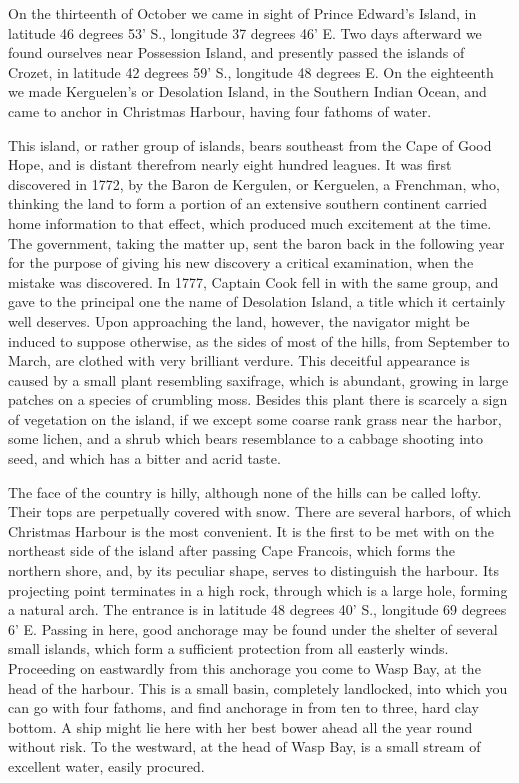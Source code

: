 On the thirteenth of October we came in sight of Prince Edward's Island, in
latitude 46 degrees 53' S., longitude 37 degrees 46' E. Two days afterward we
found ourselves near Possession Island, and presently passed the islands of
Crozet, in latitude 42 degrees 59' S., longitude 48 degrees E. On the eighteenth
we made Kerguelen's or Desolation Island, in the Southern Indian Ocean, and came
to anchor in Christmas Harbour, having four fathoms of water. 

This island, or rather group of islands, bears southeast from the Cape of
Good Hope, and is distant therefrom nearly eight hundred leagues. It was first
discovered in 1772, by the Baron de Kergulen, or Kerguelen, a Frenchman, who,
thinking the land to form a portion of an extensive southern continent carried
home information to that effect, which produced much excitement at the time. The
government, taking the matter up, sent the baron back in the following year for
the purpose of giving his new discovery a critical examination, when the mistake
was discovered. In 1777, Captain Cook fell in with the same group, and gave to
the principal one the name of Desolation Island, a title which it certainly well
deserves. Upon approaching the land, however, the navigator might be induced to
suppose otherwise, as the sides of most of the hills, from September to March,
are clothed with very brilliant verdure. This deceitful appearance is caused by
a small plant resembling saxifrage, which is abundant, growing in large patches
on a species of crumbling moss. Besides this plant there is scarcely a sign of
vegetation on the island, if we except some coarse rank grass near the harbor,
some lichen, and a shrub which bears resemblance to a cabbage shooting into
seed, and which has a bitter and acrid taste. 

The face of the country is hilly, although none of the hills can be called
lofty. Their tops are perpetually covered with snow. There are several harbors,
of which Christmas Harbour is the most convenient. It is the first to be met
with on the northeast side of the island after passing Cape Francois, which
forms the northern shore, and, by its peculiar shape, serves to distinguish the
harbour. Its projecting point terminates in a high rock, through which is a
large hole, forming a natural arch. The entrance is in latitude 48 degrees 40'
S., longitude 69 degrees 6' E. Passing in here, good anchorage may be found
under the shelter of several small islands, which form a sufficient protection
from all easterly winds. Proceeding on eastwardly from this anchorage you come
to Wasp Bay, at the head of the harbour. This is a small basin, completely
landlocked, into which you can go with four fathoms, and find anchorage in from
ten to three, hard clay bottom. A ship might lie here with her best bower ahead
all the year round without risk. To the westward, at the head of Wasp Bay, is a
small stream of excellent water, easily procured. 


